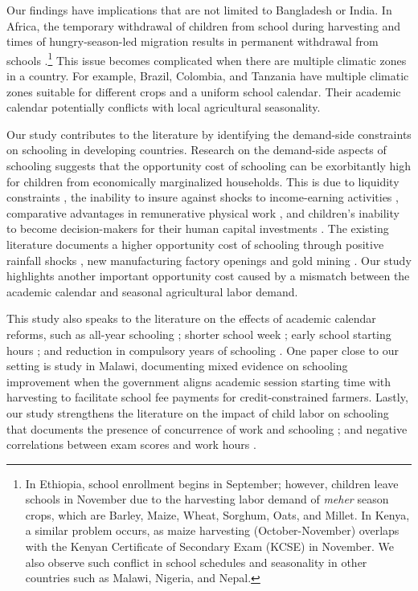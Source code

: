 \documentclass[12pt,letterpaper]{article}
\newcommand{\0}{\ensuremath{\mbox{\boldmath $0$}}}
\begin{document}
Our findings have implications that are not limited to Bangladesh or India. In Africa, the temporary withdrawal of children from school during harvesting and times of hungry-season-led migration results in permanent withdrawal from schools \citep{ andvig1999child, Colclough2000, Hadley2010, kadzamira2003can, WorldBank1998}.\footnote{In Ethiopia, school enrollment begins in September; however, children leave schools in November due to the harvesting labor demand of \textit{meher} season crops, which are Barley, Maize, Wheat, Sorghum, Oats, and Millet. In Kenya, a similar problem occurs, as maize harvesting (October-November) overlaps with the Kenyan Certificate of Secondary Exam (KCSE) in November. We also observe such conflict in school schedules and seasonality in other countries such as Malawi, Nigeria, and Nepal. } This issue becomes complicated when there are multiple climatic zones in a country. For example, Brazil, Colombia, and Tanzania have multiple climatic zones suitable for different crops and a uniform school calendar. Their academic calendar potentially conflicts with local agricultural seasonality.

Our study contributes to the literature by identifying the demand-side constraints on schooling in developing countries. Research on the demand-side aspects of schooling suggests that the opportunity cost of schooling can be exorbitantly high for children from economically marginalized households. This is due to liquidity constraints  \citep{JacobySkoufias1997, BeegleDehejiaGatti2006}, the inability to insure against shocks to income-earning activities \citep{Jensen2000, deJanvryetal2006, Case2006}, comparative advantages in remunerative physical work \citep{PittRosenzweigHassan2010}, and children's inability to become decision-makers for their human capital investments  \citep{BalandRobinson2000}. The existing literature documents a higher opportunity cost of schooling through positive rainfall shocks \citep{shah2017drought}, new manufacturing factory openings \citep{atkin2016endogenous} and gold mining \citep{santos2018blessing}. Our study highlights another important opportunity cost caused by a mismatch between the academic calendar and seasonal agricultural labor demand.

This study also speaks to the literature on the effects of academic calendar reforms, such as all-year schooling \citep{ mcmullen2012impact, graves2010academic}; shorter school week \citep{anderson2015does}; early school starting hours \citep{cortes2012role,  hinrichs2011bell, edwards2012early, carrell2011s}; and reduction in compulsory years of schooling \citep{elsayed2021less}. One paper close to our setting is \cite{dillon2021selling} study in Malawi, documenting mixed evidence on schooling improvement when the government aligns academic session starting time with harvesting to facilitate school fee payments for credit-constrained farmers. Lastly, our study strengthens the literature on the impact of child labor on schooling that documents the presence of concurrence of work and schooling \citep{RavallionWodon2000, Edmonds2007, Dumas2012}; and negative correlations between exam scores and work hours \citep{AkabayashiPsacharopoulos1999, Heady2003, Gunnarsson2006}.
\end{document}
